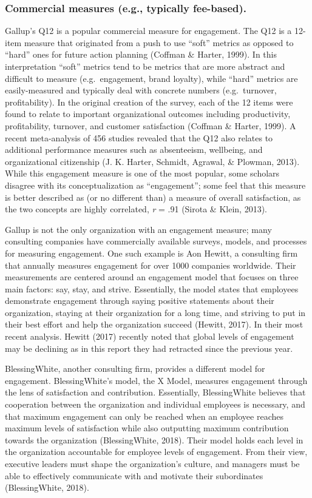 \documentclass[
  man]{apa6}
\begin{document}
\hypertarget{commercial-measures-e.g.-typically-fee-based.}{%
\subsubsection{Commercial measures (e.g., typically fee-based).}\label{commercial-measures-e.g.-typically-fee-based.}}

Gallup's Q12 is a popular commercial measure for engagement. The Q12 is a 12-item measure that originated from a push to use ``soft'' metrics as opposed to ``hard'' ones for future action planning (Coffman \& Harter, 1999). In this interpretation ``soft'' metrics tend to be metrics that are more abstract and difficult to measure (e.g.~engagement, brand loyalty), while ``hard'' metrics are easily-measured and typically deal with concrete numbers (e.g.~turnover, profitability). In the original creation of the survey, each of the 12 items were found to relate to important organizational outcomes including productivity, profitability, turnover, and customer satisfaction (Coffman \& Harter, 1999). A recent meta-analysis of 456 studies revealed that the Q12 also relates to additional performance measures such as absenteeism, wellbeing, and organizational citizenship (J. K. Harter, Schmidt, Agrawal, \& Plowman, 2013). While this engagement measure is one of the most popular, some scholars disagree with its conceptualization as ``engagement''; some feel that this measure is better described as (or no different than) a measure of overall satisfaction, as the two concepts are highly correlated, \emph{r} = .91 (Sirota \& Klein, 2013).

Gallup is not the only organization with an engagement measure; many consulting companies have commercially available surveys, models, and processes for measuring engagement. One such example is Aon Hewitt, a consulting firm that annually measures engagement for over 1000 companies worldwide. Their measurements are centered around an engagement model that focuses on three main factors: say, stay, and strive. Essentially, the model states that employees demonstrate engagement through saying positive statements about their organization, staying at their organization for a long time, and striving to put in their best effort and help the organization succeed (Hewitt, 2017). In their most recent analysis. Hewitt (2017) recently noted that global levels of engagement may be declining as in this report they had retracted since the previous year.

BlessingWhite, another consulting firm, provides a different model for engagement. BlessingWhite's model, the X Model, measures engagement through the lens of satisfaction and contribution. Essentially, BlessingWhite believes that cooperation between the organization and individual employees is necessary, and that maximum engagement can only be reached when an employee reaches maximum levels of satisfaction while also outputting maximum contribution towards the organization (BlessingWhite, 2018). Their model holds each level in the organization accountable for employee levels of engagement. From their view, executive leaders must shape the organization's culture, and managers must be able to effectively communicate with and motivate their subordinates (BlessingWhite, 2018).
\end{document}
